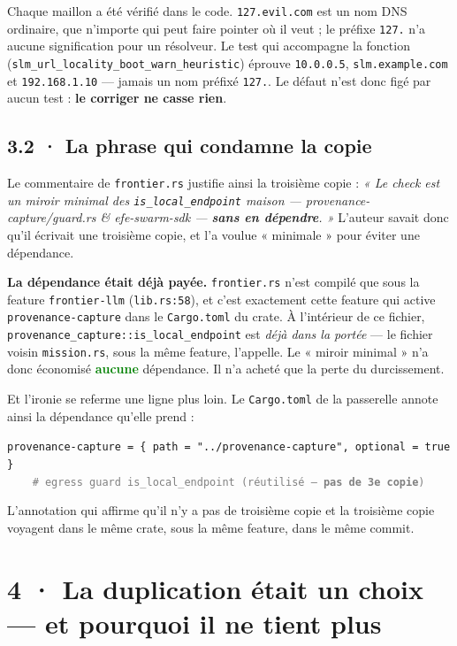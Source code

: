 \documentclass[10pt]{article}
\newcommand{\best}[1]{\textcolor{green}{\textbf{#1}}}
\newcommand{\sz}[1]{\textcolor{grey}{\small\textsf{#1}}}
\newcommand{\code}[1]{\texttt{\small #1}}
\begin{document}
Chaque maillon a été vérifié dans le code. \code{127.evil.com} est un nom DNS ordinaire, que
n'importe qui peut faire pointer où il veut ; le préfixe \code{127.} n'a aucune signification pour un
résolveur. Le test qui accompagne la fonction
(\code{slm\_url\_locality\_boot\_warn\_heuristic}) éprouve \code{10.0.0.5},
\code{slm.example.com} et \code{192.168.1.10} --- jamais un nom préfixé \code{127.}. Le défaut n'est
donc figé par aucun test : \textbf{le corriger ne casse rien}.

\subsection{3.2 · La phrase qui condamne la copie}

Le commentaire de \code{frontier.rs} justifie ainsi la troisième copie : \emph{« Le check est un
miroir minimal des \code{is\_local\_endpoint} maison --- provenance-capture/guard.rs \&
efe-swarm-sdk --- \textbf{sans en dépendre}. »} L'auteur savait donc qu'il écrivait une troisième
copie, et l'a voulue « minimale » pour éviter une dépendance.

\begin{alerte}
\textbf{La dépendance était déjà payée.} \code{frontier.rs} n'est compilé que sous la feature
\code{frontier-llm} (\code{lib.rs:58}), et c'est exactement cette feature qui active
\code{provenance-capture} dans le \code{Cargo.toml} du crate. À l'intérieur de ce fichier,
\code{provenance\_capture::is\_local\_endpoint} est \emph{déjà dans la portée} --- le fichier voisin
\code{mission.rs}, sous la même feature, l'appelle. Le « miroir minimal » n'a donc économisé
\best{aucune} dépendance. Il n'a acheté que la perte du durcissement.
\end{alerte}

Et l'ironie se referme une ligne plus loin. Le \code{Cargo.toml} de la passerelle annote ainsi la
dépendance qu'elle prend :

\begin{extrait}
\code{provenance-capture = \{ path = "../provenance-capture", optional = true \}} \\
\code{\ \ \ \ \sz{\# egress guard is\_local\_endpoint (réutilisé --- \textbf{pas de 3e copie})}}
\end{extrait}

L'annotation qui affirme qu'il n'y a pas de troisième copie et la troisième copie voyagent dans le
même crate, sous la même feature, dans le même commit.

\section{4 · La duplication était un choix --- et pourquoi il ne tient plus}
\end{document}
